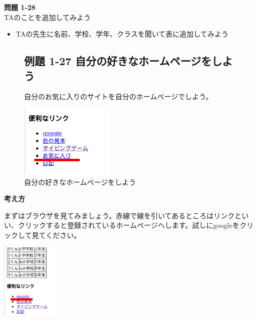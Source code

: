 \noindent \textbf{問題 1-28}\\
TAのことを追加してみよう

\begin{itemize}
  \item
        TAの先生に名前、学校、学年、クラスを聞いて表に追加してみよう
\end{itemize}

\bigskip

\clearpage

\centering
\begin{figure}
  \subsection{例題 1-27 自分の好きなホームページをしよう}

  \flushleft
  自分のお気に入りのサイトを自分のホームページでしよう。
  \begin{minipage}{\textwidth}
    {\upshape
      \centering
      \includegraphics[width=0.4\textwidth]{text01-img/textbook-img193.png}%
      \caption{自分の好きなホームページをしよう}
    }
  \end{minipage}
\end{figure}




\bigskip

\flushleft

\textbf{考え方}



まずはブラウザを見てみましょう。赤線で線を引いてあるところはリンクといい、クリックすると登録されているホームページへします。試しにgoogleをクリックして見てください。


\bigskip

\centering
\includegraphics[width=0.22\textwidth]{text01-img/textbook-img194.png}


